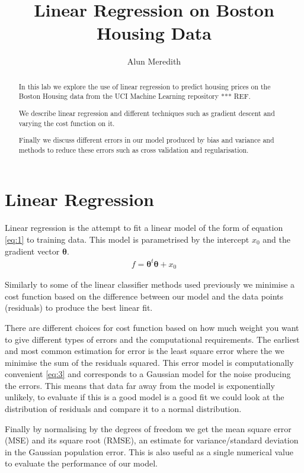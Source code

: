 \documentclass[a4paper,11pt, twocolumn]{article}
\begin{document}
\title{Linear Regression on Boston Housing Data}
\author{Alun Meredith}
\maketitle
\begin{abstract}

In this lab we explore the use of linear regression to predict housing prices on the Boston Housing data from the UCI Machine Learning repository *** REF. 

We describe linear regression and different techniques such as gradient descent and varying the cost function on it.  

Finally we discuss different errors in our model produced by bias and variance and methods to reduce these errors such as cross validation and regularisation. 
\end{abstract}

\section{Linear Regression}
Linear regression is the attempt to fit a linear model of the form of equation \ref{eq:1} to training data. This model is parametrised  by the intercept $x_0$ and the gradient vector $\mathbf{\theta}$. 
\begin{align}
	f = \mathbf{\theta}^t\mathbf{\theta} + x_0
	\label{eq:1}
\end{align}

Similarly to some of the linear classifier methods used previously we minimise a cost function based on the difference between our model and the data points (residuals) to produce the best linear fit. 

There are different choices for cost function based on how much weight you want to give different types of errors and the computational requirements. The earliest and most common estimation for error is the least square error where the we minimise the sum of the residuals squared. This error model is computationally convenient \ref{eq:3} and corresponds to a Gaussian model for the noise producing the errors. This means that data far away from the model is exponentially unlikely, to evaluate if this is a good model is a good fit we could look at the distribution of residuals and compare it to a normal distribution. 

Finally by normalising by the degrees of freedom we get the mean square error (MSE) and its square root (RMSE), an estimate for variance/standard deviation in the Gaussian population error. This is also useful as a single numerical value to evaluate the performance of our model.
\end{document}
